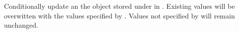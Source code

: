 Conditionally update an the object stored under  in .
Existing values will be overwitten with the values specified by .
Values not specified by  will remain unchanged.



